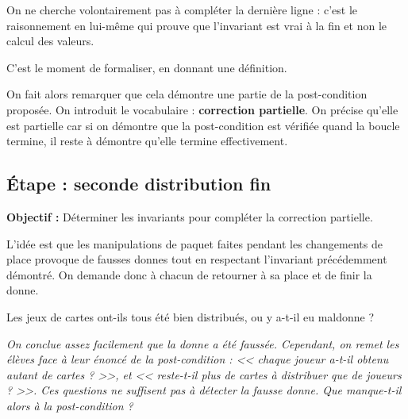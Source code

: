 On ne cherche volontairement pas à compléter la dernière ligne : c'est le raisonnement en lui-même qui prouve que l'invariant est vrai à la fin et non le calcul des valeurs.

C'est le moment de formaliser, en donnant une définition.

\begin{center}\end{center}

On fait alors remarquer que cela démontre une partie de la post-condition proposée. On introduit le vocabulaire : {\bfseries correction partielle}. On précise qu'elle est partielle car si on démontre que la post-condition est vérifiée quand la boucle termine, il reste à démontre qu'elle termine effectivement.

\subsection{Étape  : seconde distribution fin}

{\bfseries Objectif :} Déterminer les invariants pour compléter la correction partielle.

\medskip

L'idée est que les manipulations de paquet faites pendant les changements de place provoque de fausses donnes tout en respectant l'invariant précédemment démontré. On demande donc à chacun de retourner à sa place et de finir la donne.

\begin{question}
    Les jeux de cartes ont-ils tous été bien distribués, ou y a-t-il eu maldonne ?
\end{question}

\textit{On conclue assez facilement que la donne a été faussée. Cependant, on remet les élèves face à leur énoncé de la post-condition : << chaque joueur a-t-il obtenu autant de cartes ? >>, et << reste-t-il plus de cartes à distribuer que de joueurs ? >>. Ces questions ne suffisent pas à détecter la fausse donne. Que manque-t-il alors à la post-condition ?}

